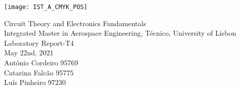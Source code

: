 \thispagestyle {empty}

\texttt{[image: IST\_A\_CMYK\_POS]}

\begin{center}
%
\vspace{1.0cm}



\vspace{1cm}
{\FontLb Circuit Theory and Electronics Fundamentals} \\ 
\vspace{1cm}
{\FontSn Integrated Master in Aerospace Engineering, Técnico, University of Lisbon} \\ 
\vspace{1cm}
{\FontSn Laboratory Report-T4} \\
\vspace{1cm}
{\FontSn May 22nd, 2021} \\ 
\vspace{1cm}
{\FontSn António Cordeiro 95769} \\ 
\vspace{00.5cm}
{\FontSn Catarina Falcão 95775} \\ 
\vspace{0.5cm}
{\FontSn Luís Pinheiro 97230} \\ 
\end{center}

\newpage


